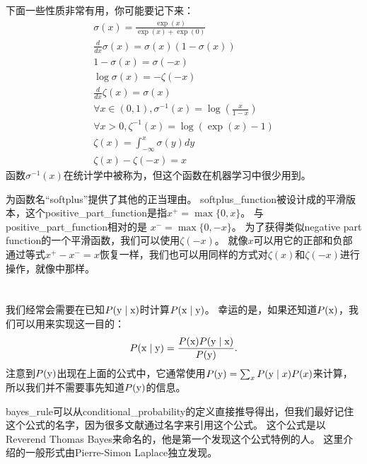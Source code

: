 
下面一些性质非常有用，你可能要记下来：
\begin{gather}
\sigma(x) = \frac{\exp(x)}{\exp(x)+\exp(0)}\\
\frac{d}{dx} \sigma(x) = \sigma(x)(1 - \sigma(x))\\
1-\sigma(x) = \sigma(-x)\\
\log \sigma(x) = -\zeta(-x)\\
\frac{d}{dx} \zeta(x) = \sigma(x)\\
\forall x \in (0, 1), \sigma^{-1}(x) = \log \left (  \frac{x}{1-x} \right)\\
\forall x>0, \zeta^{-1}(x) = \log(\exp(x) - 1)\\
\zeta(x) = \int_{-\infty}^x \sigma(y) dy\\
\zeta(x) - \zeta(-x) = x
\label{eq:3.41}
\end{gather}
函数$\sigma^{-1}(x)$在统计学中被称为，但这个函数在机器学习中很少用到。


为函数名``softplus''提供了其他的正当理由。
\gls{softplus_function}被设计成的平滑版本，这个\gls{positive_part_function}是指$x^+ = \max \{ 0, x\}$。
与\gls{positive_part_function}相对的是 $x^- = \max\{ 0, -x\}$。
为了获得类似\gls{negative part function}的一个平滑函数，我们可以使用$\zeta(-x)$。
就像$x$可以用它的正部和负部通过等式$x^+ - x^- = x$恢复一样，我们也可以用同样的方式对$\zeta(x)$和$\zeta(-x)$进行操作，就像中那样。

\section{}
\label{sec:bayes_rule}

我们经常会需要在已知$P(\mathrm{y} \mid \mathrm{x})$时计算$P(\mathrm{x} \mid \mathrm{y})$。
幸运的是，如果还知道$P(\mathrm{x})$，我们可以用来实现这一目的：
\begin{equation}
P(\mathrm{x} \mid \mathrm{y}) = \frac{P(\mathrm{x}) P(\mathrm{y} \mid \mathrm{x})}{P(\mathrm{y})}.
\end{equation}
注意到$P(\mathrm{y})$出现在上面的公式中，它通常使用$P(\mathrm{y}) = \sum_x P(\mathrm{y} \mid x) P(x)$来计算，所以我们并不需要事先知道$P(\mathrm{y})$的信息。

\gls{bayes_rule}可以从\gls{conditional_probability}的定义直接推导得出，但我们最好记住这个公式的名字，因为很多文献通过名字来引用这个公式。
这个公式是以Reverend Thomas Bayes来命名的，他是第一个发现这个公式特例的人。
这里介绍的一般形式由Pierre-Simon Laplace独立发现。

